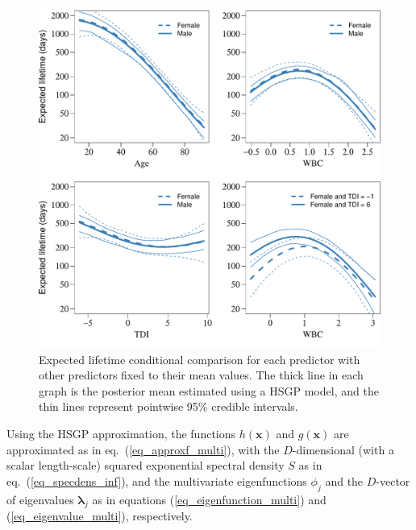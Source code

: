 \begin{figure}
\centering
\includegraphics[scale=0.70, trim = 0mm 5mm 0mm 0mm, clip]{fig15_posteriors_leukemia.pdf}
\caption{Expected lifetime conditional comparison for each predictor with other predictors fixed to their mean values. The thick line in each graph is the posterior mean estimated using a HSGP model, and the thin lines represent pointwise 95\% credible intervals.}
  \label{fig15_posteriors_leukemia}
\end{figure}

Using the HSGP approximation, the functions $h(\bm{x})$ and $g(\bm{x})$ are approximated as in eq.~(\ref{eq_approxf_multi}), with the $D$-dimensional (with a scalar length-scale) squared exponential spectral density $S$ as in eq.~(\ref{eq_specdens_inf}), and the multivariate eigenfunctions $\phi_j$ and the $D$-vector of eigenvalues $\bm{\lambda}_j$ as in equations (\ref{eq_eigenfunction_multi}) and  (\ref{eq_eigenvalue_multi}), respectively.

